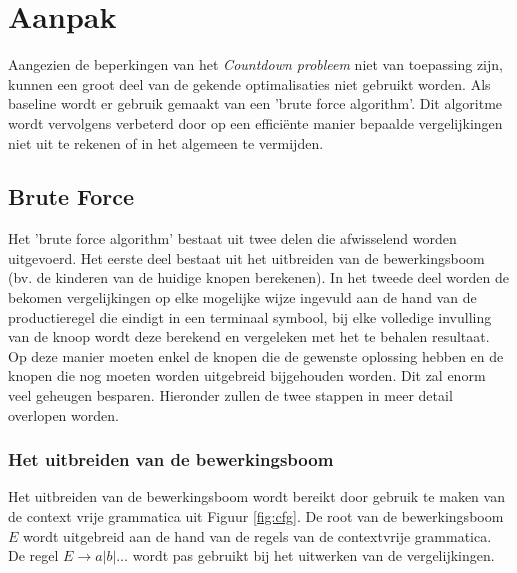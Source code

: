 \documentclass[Main.tex]{subfiles}
\begin{document}
\section{Aanpak}
Aangezien de beperkingen van het \textit{Countdown probleem} niet van toepassing zijn, kunnen een groot deel van de gekende optimalisaties niet gebruikt worden. Als baseline wordt er gebruik gemaakt van een 'brute force algorithm'. Dit algoritme wordt vervolgens verbeterd door op een effici\"ente manier bepaalde vergelijkingen niet uit te rekenen of in het algemeen te vermijden.

\subsection{Brute Force}
Het 'brute force algorithm' bestaat uit twee delen die afwisselend worden uitgevoerd. Het eerste deel bestaat uit het uitbreiden van de bewerkingsboom (bv. de kinderen van de huidige knopen berekenen). In het tweede deel worden de bekomen vergelijkingen op elke mogelijke wijze ingevuld aan de hand van de productieregel die eindigt in een terminaal symbool, bij elke volledige invulling van de knoop wordt deze berekend en vergeleken met het te behalen resultaat. Op deze manier moeten enkel de knopen die de gewenste oplossing hebben en de knopen die nog moeten worden uitgebreid bijgehouden worden. Dit zal enorm veel geheugen besparen. Hieronder zullen de twee stappen in meer detail overlopen worden. 

\subsubsection*{Het uitbreiden van de bewerkingsboom}
Het uitbreiden van de bewerkingsboom wordt bereikt door gebruik te maken van de context vrije grammatica uit Figuur \ref{fig:cfg}. De root van de bewerkingsboom $E$ wordt uitgebreid aan de hand van de regels van de contextvrije grammatica. De regel $E \rightarrow a | b | \dotsc$ wordt pas gebruikt bij het uitwerken van de vergelijkingen.
\end{document}
